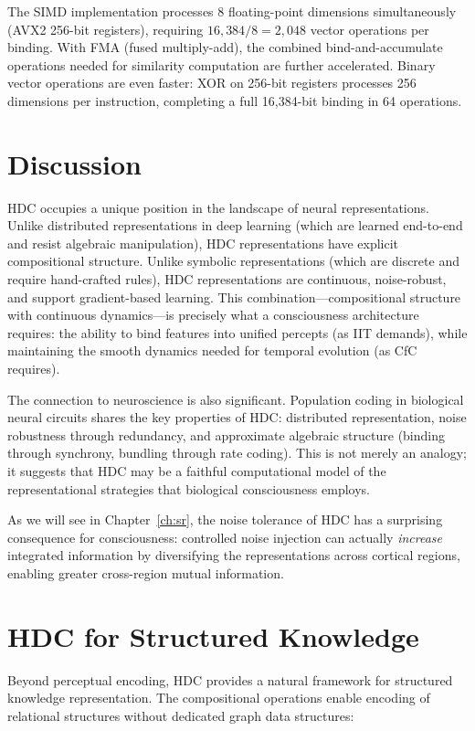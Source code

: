 \documentclass[12pt]{book}
\begin{document}
The SIMD implementation processes 8 floating-point dimensions simultaneously (AVX2 256-bit registers), requiring $16{,}384 / 8 = 2{,}048$ vector operations per binding. With FMA (fused multiply-add), the combined bind-and-accumulate operations needed for similarity computation are further accelerated. Binary vector operations are even faster: XOR on 256-bit registers processes 256 dimensions per instruction, completing a full 16,384-bit binding in 64 operations.

\section{Discussion}

HDC occupies a unique position in the landscape of neural representations. Unlike distributed representations in deep learning (which are learned end-to-end and resist algebraic manipulation), HDC representations have explicit compositional structure. Unlike symbolic representations (which are discrete and require hand-crafted rules), HDC representations are continuous, noise-robust, and support gradient-based learning. This combination---compositional structure with continuous dynamics---is precisely what a consciousness architecture requires: the ability to bind features into unified percepts (as IIT demands), while maintaining the smooth dynamics needed for temporal evolution (as CfC requires).

The connection to neuroscience is also significant. Population coding in biological neural circuits shares the key properties of HDC: distributed representation, noise robustness through redundancy, and approximate algebraic structure (binding through synchrony, bundling through rate coding). This is not merely an analogy; it suggests that HDC may be a faithful computational model of the representational strategies that biological consciousness employs.

As we will see in Chapter~\ref{ch:sr}, the noise tolerance of HDC has a surprising consequence for consciousness: controlled noise injection can actually \textit{increase} integrated information by diversifying the representations across cortical regions, enabling greater cross-region mutual information.

\section{HDC for Structured Knowledge}

Beyond perceptual encoding, HDC provides a natural framework for structured knowledge representation. The compositional operations enable encoding of relational structures without dedicated graph data structures:
\end{document}
